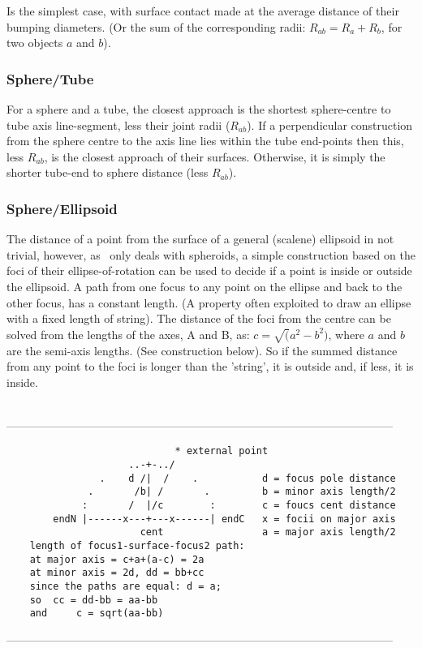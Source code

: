 {{{{{Is the simplest case, with surface contact made at the average distance of their bumping diameters.
(Or the sum of the corresponding radii: $R_{ab} = R_a + R_b$, for two objects $a$ and $b$).

\subsubsection{Sphere/Tube}

For a sphere and a tube, the closest approach is the shortest sphere-centre to tube axis 
line-segment, less their joint radii ($R_{ab}$).   If a perpendicular construction from the 
sphere centre to the axis line lies within the tube end-points then this, less $R_{ab}$,
is the closest approach of their surfaces.  Otherwise, it is simply the shorter tube-end to
sphere distance (less $R_{ab}$).

\subsubsection{Sphere/Ellipsoid}

The distance of a point from the surface of a general (scalene) ellipsoid in not trivial,
however, as \NAME\ only deals with spheroids, a simple construction based on the foci of
their ellipse-of-rotation can be used to decide if a point is inside or outside the ellipsoid.
A path from one focus to any point on the ellipse and back to the other focus, has a constant
length.  (A property often exploited to draw an ellipse with a fixed length of string).
The distance of the foci from the centre can be solved from the lengths of the axes, A and B,
as: $c = \surd(a^2-b^2)$, where $a$ and $b$ are the semi-axis lengths.  (See construction below).
So if the summed distance from any point to the foci is longer than the 'string', it is outside
and, if less, it is inside.
\begin{singlespace}
\ \\
------------------------------------------------------------------------------------------------------
\begin{footnotesize}
\begin{verbatim}
                             * external point
                     ..-+-../
                .    d /|  /    .           d = focus pole distance
              .       /b| /       .         b = minor axis length/2
             :       /  |/c        :        c = foucs cent distance
        endN |------x---+---x------| endC   x = focii on major axis
                       cent                 a = major axis length/2
	length of focus1-surface-focus2 path:
	at major axis = c+a+(a-c) = 2a
	at minor axis = 2d, dd = bb+cc
	since the paths are equal: d = a;
	so	cc = dd-bb = aa-bb
	and 	c = sqrt(aa-bb)
\end{verbatim}
\end{footnotesize}
------------------------------------------------------------------------------------------------------
\end{singlespace}

}}}}}
